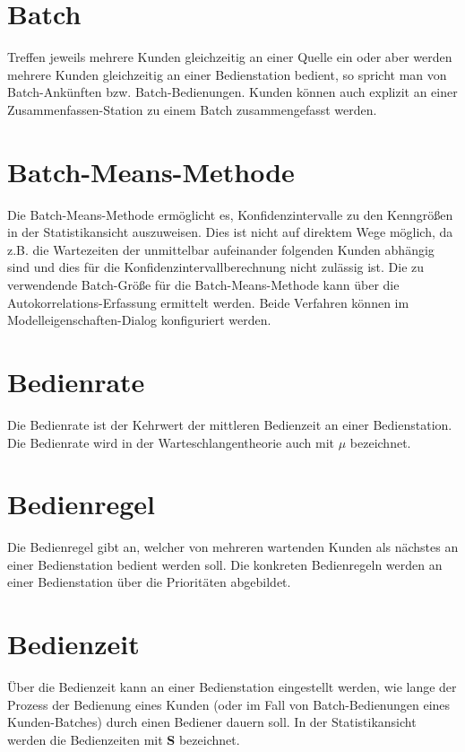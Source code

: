 \section*{Batch}


Treffen jeweils mehrere Kunden gleichzeitig an einer Quelle
ein oder aber werden mehrere Kunden gleichzeitig an einer Bedienstation
bedient, so spricht man von Batch-Ankünften bzw. Batch-Bedienungen. Kunden können auch explizit an einer
Zusammenfassen-Station zu einem Batch zusammengefasst werden.

\section*{Batch-Means-Methode}


Die Batch-Means-Methode ermöglicht es, Konfidenzintervalle zu den Kenngrößen in der
Statistikansicht auszuweisen. Dies ist nicht auf direktem
Wege möglich, da z.B. die Wartezeiten der unmittelbar aufeinander folgenden Kunden abhängig sind
und dies für die Konfidenzintervallberechnung nicht zulässig ist. Die zu verwendende Batch-Größe
für die Batch-Means-Methode kann über die Autokorrelations-Erfassung ermittelt werden. Beide
Verfahren können im Modelleigenschaften-Dialog konfiguriert werden.

\section*{Bedienrate}


Die Bedienrate ist der Kehrwert der mittleren Bedienzeit an einer Bedienstation.
Die Bedienrate wird in der Warteschlangentheorie auch mit $\mu$ bezeichnet.

\section*{Bedienregel}


Die Bedienregel gibt an, welcher von mehreren wartenden Kunden als nächstes an einer
Bedienstation bedient werden soll. Die konkreten
Bedienregeln werden an einer Bedienstation über die Prioritäten abgebildet.

\section*{Bedienzeit}


Über die Bedienzeit kann an einer Bedienstation eingestellt werden,
wie lange der Prozess der Bedienung eines Kunden (oder im Fall von Batch-Bedienungen eines Kunden-Batches)
durch einen Bediener dauern soll.
In der Statistikansicht werden die Bedienzeiten mit \textbf{S} bezeichnet.

